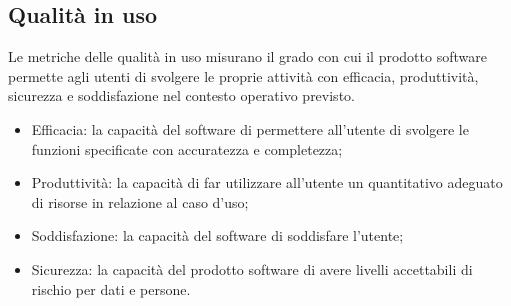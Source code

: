 \subsection{Qualità in uso}
Le metriche delle qualità in uso misurano il grado con cui il prodotto software permette agli utenti di svolgere le proprie attività con efficacia, produttività, sicurezza e soddisfazione nel contesto operativo previsto.
\begin{itemize}
\item Efficacia: la capacità del software di permettere all'utente di svolgere le funzioni specificate con accuratezza e completezza;
\item Produttività: la capacità di far utilizzare all'utente un quantitativo adeguato di risorse in relazione al caso d'uso;
\item Soddisfazione: la capacità del software di soddisfare l'utente;
\item Sicurezza: la capacità del prodotto software di avere livelli accettabili di rischio per dati e persone.
\end{itemize}